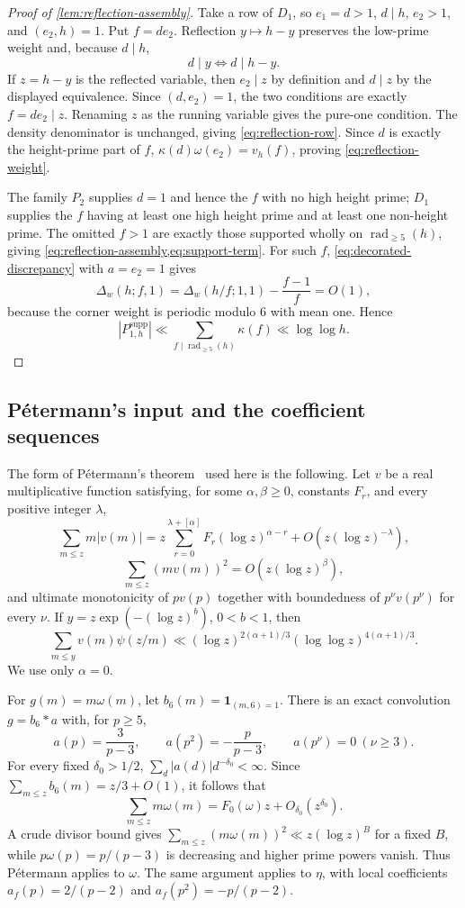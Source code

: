 \documentclass[11pt]{article}
\theoremstyle{definition}
\theoremstyle{remark}
\newcommand{\rad}{\operatorname{rad}}
\newcommand{\1}{\mathbf 1}
\newcommand{\om}{\omega}
\newcommand{\supp}{\mathrm{supp}}
\begin{document}
\begin{proof}[Proof of \cref{lem:reflection-assembly}]
Take a row of $D_1$, so $e_1=d>1$, $d\mid h$, $e_2>1$, and $(e_2,h)=1$.  Put $f=de_2$.  Reflection $y\mapsto h-y$ preserves the low-prime weight and, because $d\mid h$,
\[
d\mid y\Longleftrightarrow d\mid h-y.
\]
If $z=h-y$ is the reflected variable, then $e_2\mid z$ by definition and
$d\mid z$ by the displayed equivalence.  Since $(d,e_2)=1$, the two
conditions are exactly $f=de_2\mid z$.  Renaming $z$ as the running variable
gives the pure-one condition.  The density denominator is unchanged, giving
\cref{eq:reflection-row}.  Since $d$ is exactly the height-prime part of $f$,
$\kappa(d)\om(e_2)=v_h(f)$, proving \cref{eq:reflection-weight}.

The family $P_2$ supplies $d=1$ and hence the $f$ with no high height prime; $D_1$ supplies the $f$ having at least one high height prime and at least one non-height prime.  The omitted $f>1$ are exactly those supported wholly on $\rad_{\ge5}(h)$, giving \cref{eq:reflection-assembly,eq:support-term}.  For such $f$, \cref{eq:decorated-discrepancy} with $a=e_2=1$ gives
\[
\Delta_w(h;f,1)=\Delta_w(h/f;1,1)-\frac{f-1}{f}=O(1),
\]
because the corner weight is periodic modulo $6$ with mean one.  Hence
\[
|P_{1,h}^{\supp}|
\ll\sum_{f\mid\rad_{\ge5}(h)}\kappa(f)
\ll\log\log h.
\]
\end{proof}

\subsection{P\'etermann's input and the coefficient sequences}
The form of P\'etermann's theorem~\cite{Petermann1998} used here is the following.  Let $v$ be a real multiplicative function satisfying, for some $\alpha,\beta\ge0$, constants $F_r$, and every positive integer $\lambda$,
\[
\sum_{m\le z}m|v(m)|
=z\sum_{r=0}^{\lambda+[\alpha]}F_r(\log z)^{\alpha-r}
+O(z(\log z)^{-\lambda}),
\]
\[
\sum_{m\le z}(mv(m))^2=O(z(\log z)^\beta),
\]
and ultimate monotonicity of $pv(p)$ together with boundedness of $p^\nu v(p^\nu)$ for every $\nu$.  If
$y=z\exp(- (\log z)^b)$, $0<b<1$, then
\begin{equation}\label{eq:app-petermann-input}
\sum_{m\le y}v(m)\psi(z/m)
\ll(\log z)^{2(\alpha+1)/3}(\log\log z)^{4(\alpha+1)/3}.
\end{equation}
We use only $\alpha=0$.

For $g(m)=m\om(m)$, let $b_6(m)=\mathbf1_{(m,6)=1}$.  There is an exact convolution $g=b_6*a$ with, for $p\ge5$,
\[
a(p)=\frac3{p-3},\qquad
a(p^2)=-\frac p{p-3},\qquad a(p^\nu)=0\ (\nu\ge3).
\]
For every fixed $\delta_0>1/2$,
$\sum_d|a(d)|d^{-\delta_0}<\infty$.  Since
$\sum_{m\le z}b_6(m)=z/3+O(1)$, it follows that
\begin{equation}\label{eq:app-omega-linear-mean}
\sum_{m\le z}m\om(m)=F_0(\om)z+O_{\delta_0}(z^{\delta_0}).
\end{equation}
A crude divisor bound gives
$\sum_{m\le z}(m\om(m))^2\ll z(\log z)^B$ for a fixed $B$, while
$p\om(p)=p/(p-3)$ is decreasing and higher prime powers vanish.  Thus P\'etermann applies to $\om$.  The same argument applies to $\eta$, with local coefficients
$a_f(p)=2/(p-2)$ and $a_f(p^2)=-p/(p-2)$.
\end{document}
